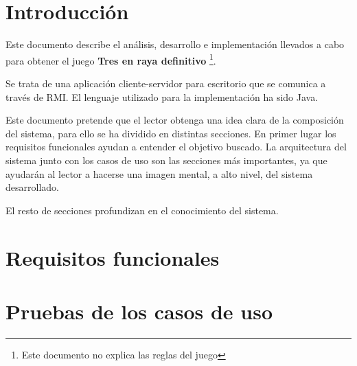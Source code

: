 \documentclass[a4paper,11pt,oneside]{article}
\begin{document}

\clearpage
\section{Introducción}

Este documento describe el análisis, desarrollo e implementación llevados a cabo para obtener
el juego \textbf{Tres en raya definitivo} \footnote{Este documento no explica las reglas del juego}.

Se trata de una aplicación cliente-servidor para escritorio que se comunica a través de RMI.
El lenguaje utilizado para la implementación ha sido Java.

Este documento pretende que el lector obtenga una idea clara de la composición del sistema, para ello
se ha dividido en distintas secciones. En primer lugar los requisitos funcionales ayudan a entender el objetivo
buscado. La arquitectura del sistema junto con los casos de uso son las secciones más importantes, ya
que ayudarán al lector a hacerse una imagen mental, a alto nivel, del sistema desarrollado.

El resto de secciones profundizan en el conocimiento del sistema.

\clearpage

\pagestyle{fancy}

\section{Requisitos funcionales}
 
%
\clearpage


\setcounter{page}{\value{page}}
\clearpage
\section{Pruebas de los casos de uso}


%
%
%
\end{document}
